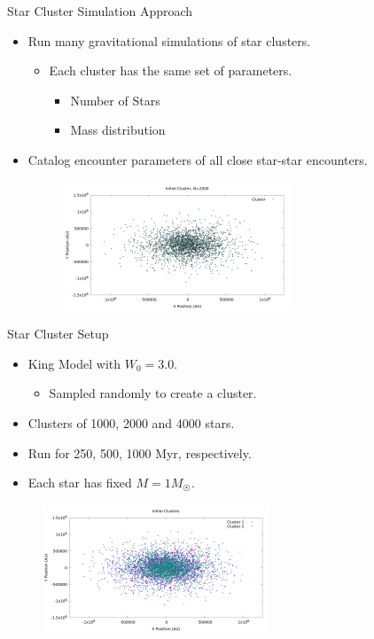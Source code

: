 \documentclass{beamer}
\begin{document}
\begin{frame}{Star Cluster Simulation Approach}
    \begin{itemize}
        \item Run many gravitational simulations of star clusters.
            \begin{itemize}
                \item Each cluster has the same set of parameters.
                \begin{itemize}
                    \item Number of Stars
                    \item Mass distribution
                \end{itemize}
            \end{itemize}
        \item Catalog encounter parameters of all close star-star encounters.
        \begin{figure}
            \includegraphics[height=1.5in]{cluster1.png}
        \end{figure}
    \end{itemize}
\end{frame}

\begin{frame}{Star Cluster Setup}
    \begin{itemize}
        \item King Model with $W_0 = 3.0$.
            \begin{itemize}
                \item Sampled randomly to create a cluster.
            \end{itemize}
        \item Clusters of 1000, 2000 and 4000 stars.
        \item Run for 250, 500, 1000 Myr, respectively.
        \item Each star has fixed $M = 1 M_{\astrosun}$.
    \end{itemize}
    \begin{figure}
        \centering
        \includegraphics[height=1.5in]{cluster_superimposed.png}
    \end{figure}
\end{frame}
\end{document}
